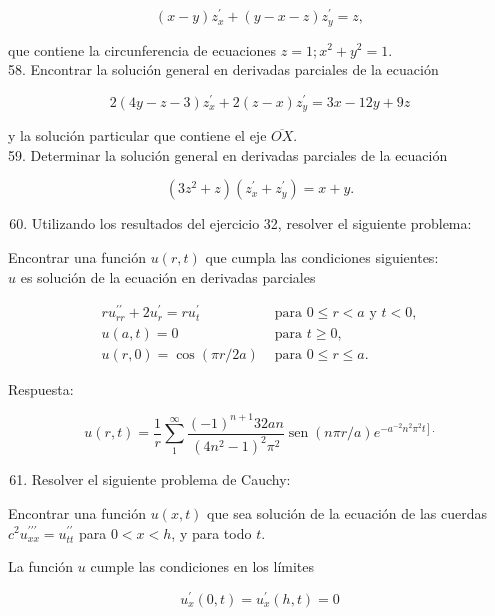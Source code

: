 \documentclass[10pt]{article}
\theoremstyle{plain}
\theoremstyle{definition}
\theoremstyle{remark}
\begin{document}
$$
(x-y) z_{x}^{\prime}+(y-x-z) z_{y}^{\prime}=z,
$$

que contiene la circunferencia de ecuaciones $z=1 ; x^{2}+y^{2}=1$.\\
58. Encontrar la solución general en derivadas parciales de la ecuación

$$
2(4 y-z-3) z_{x}^{\prime}+2(z-x) z_{y}^{\prime}=3 x-12 y+9 z
$$

y la solución particular que contiene el eje $\overline{O X}$.\\
59. Determinar la solución general en derivadas parciales de la ecuación

$$
\left(3 z^{2}+z\right)\left(z_{x}^{\prime}+z_{y}^{\prime}\right)=x+y .
$$

\begin{enumerate}
  \setcounter{enumi}{59}
  \item Utilizando los resultados del ejercicio 32, resolver el siguiente problema:
\end{enumerate}

Encontrar una función $u(r, t)$ que cumpla las condiciones siguientes:\\
$u$ es solución de la ecuación en derivadas parciales

$$
\begin{array}{ll}
r u_{r r}^{\prime \prime}+2 u_{r}^{\prime}=r u_{t}^{\prime} & \text { para } 0 \leqslant r<a \text { y } t<0, \\
u(a, t)=0 & \text { para } t \geqslant 0, \\
u(r, 0)=\cos (\pi r / 2 a) & \text { para } 0 \leqslant r \leqslant a .
\end{array}
$$

Respuesta:

$$
u(r, t)=\frac{1}{r} \sum_{1}^{\infty} \frac{(-1)^{n+1} 32 a n}{\left(4 n^{2}-1\right)^{2} \pi^{2}} \operatorname{sen}(n \pi r / a) e^{\left.-a^{-2} n^{2} \pi^{2} t\right] .}
$$

\begin{enumerate}
  \setcounter{enumi}{60}
  \item Resolver el siguiente problema de Cauchy:
\end{enumerate}

Encontrar una función $u(x, t)$ que sea solución de la ecuación de las cuerdas $c^{2} u_{x x}^{\prime \prime \prime}=u_{t t}^{\prime \prime}$ para $0<x<h$, y para todo $t$.

La función $u$ cumple las condiciones en los límites

$$
u_{x}^{\prime}(0, t)=u_{x}^{\prime}(h, t)=0
$$
\end{document}
